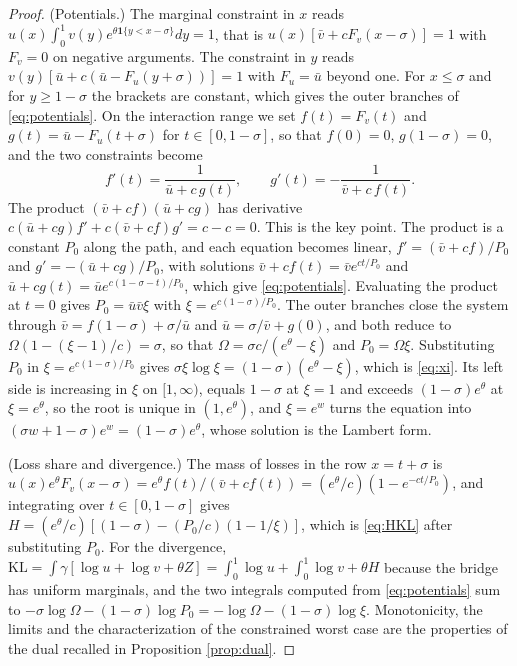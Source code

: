 \documentclass[11pt,a4paper]{article}
\theoremstyle{notesplain}
\theoremstyle{notesupright}
\numberwithin{equation}{section}
\newcommand{\KL}{\mathrm{KL}}
\begin{document}
\begin{proof}
(Potentials.) The marginal constraint in $x$ reads $u(x)\int_0^1v(y)e^{\theta\mathbf 1\{y<x-\sigma\}}dy=1$, that is $u(x)[\bar v+cF_v(x-\sigma)]=1$ with $F_v=0$ on negative arguments. The constraint in $y$ reads $v(y)[\bar u+c(\bar u-F_u(y+\sigma))]=1$ with $F_u=\bar u$ beyond one. For $x\le\sigma$ and for $y\ge1-\sigma$ the brackets are constant, which gives the outer branches of \eqref{eq:potentials}. On the interaction range we set $f(t)=F_v(t)$ and $g(t)=\bar u-F_u(t+\sigma)$ for $t\in[0,1-\sigma]$, so that $f(0)=0$, $g(1-\sigma)=0$, and the two constraints become
\begin{equation}
f'(t)=\frac1{\bar u+c\,g(t)},\qquad g'(t)=-\frac1{\bar v+c\,f(t)}.
\end{equation}
The product $(\bar v+cf)(\bar u+cg)$ has derivative $c(\bar u+cg)f'+c(\bar v+cf)g'=c-c=0$. This is the key point. The product is a constant $P_0$ along the path, and each equation becomes linear, $f'=(\bar v+cf)/P_0$ and $g'=-(\bar u+cg)/P_0$, with solutions $\bar v+cf(t)=\bar ve^{ct/P_0}$ and $\bar u+cg(t)=\bar ue^{c(1-\sigma-t)/P_0}$, which give \eqref{eq:potentials}. Evaluating the product at $t=0$ gives $P_0=\bar u\bar v\xi$ with $\xi=e^{c(1-\sigma)/P_0}$. The outer branches close the system through $\bar v=f(1-\sigma)+\sigma/\bar u$ and $\bar u=\sigma/\bar v+g(0)$, and both reduce to $\Omega(1-(\xi-1)/c)=\sigma$, so that $\Omega=\sigma c/(e^\theta-\xi)$ and $P_0=\Omega\xi$. Substituting $P_0$ in $\xi=e^{c(1-\sigma)/P_0}$ gives $\sigma\xi\log\xi=(1-\sigma)(e^\theta-\xi)$, which is \eqref{eq:xi}. Its left side is increasing in $\xi$ on $[1,\infty)$, equals $1-\sigma$ at $\xi=1$ and exceeds $(1-\sigma)e^\theta$ at $\xi=e^\theta$, so the root is unique in $(1,e^\theta)$, and $\xi=e^w$ turns the equation into $(\sigma w+1-\sigma)e^w=(1-\sigma)e^\theta$, whose solution is the Lambert form.

(Loss share and divergence.) The mass of losses in the row $x=t+\sigma$ is $u(x)e^\theta F_v(x-\sigma)=e^\theta f(t)/(\bar v+cf(t))=(e^\theta/c)(1-e^{-ct/P_0})$, and integrating over $t\in[0,1-\sigma]$ gives $H=(e^\theta/c)[(1-\sigma)-(P_0/c)(1-1/\xi)]$, which is \eqref{eq:HKL} after substituting $P_0$. For the divergence, $\KL=\int\gamma[\log u+\log v+\theta Z]=\int_0^1\log u+\int_0^1\log v+\theta H$ because the bridge has uniform marginals, and the two integrals computed from \eqref{eq:potentials} sum to $-\sigma\log\Omega-(1-\sigma)\log P_0=-\log\Omega-(1-\sigma)\log\xi$. Monotonicity, the limits and the characterization of the constrained worst case are the properties of the dual recalled in Proposition \ref{prop:dual}.
\end{proof}
\end{document}
